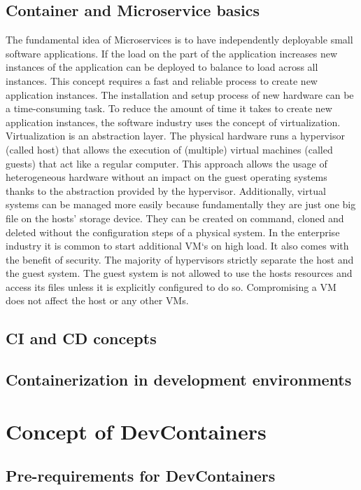 \documentclass[12pt, a4paper]{article}
\begin{document}
    \subsection{Container and Microservice basics}
    The fundamental idea of Microservices is to have independently deployable small software applications. If the load on the part of the application increases new instances of the application can be deployed to balance to load across all instances. This concept requires a fast and reliable process to create new application instances.\newline
    The installation and setup process of new hardware can be a time-consuming task. To reduce the amount of time it takes to create new application instances, the software industry uses the concept of virtualization.\newline
    Virtualization is an abstraction layer. The physical hardware runs a hypervisor (called host) that allows the execution of (multiple) virtual machines (called guests) that act like a regular computer. This approach allows the usage of heterogeneous hardware without an impact on the guest operating systems thanks to the abstraction provided by the hypervisor. Additionally, virtual systems can be managed more easily because fundamentally they are just one big file on the hosts' storage device. They can be created on command, cloned and deleted without the configuration steps of a physical system. In the enterprise industry it is common to start additional \ac{VM}`s on high load. It also comes with the benefit of security. The majority of hypervisors strictly separate the host and the guest system. The guest system is not allowed to use the hosts resources and access its files unless it is explicitly configured to do so. Compromising a \ac{VM} does not affect the host or any other \ac{VM}s.
    \subsection{\acl{CI} and \acl{CD} concepts}
    \subsection{Containerization in development environments}
\section{Concept of DevContainers}
    \subsection{Pre-requirements for DevContainers}
\end{document}
